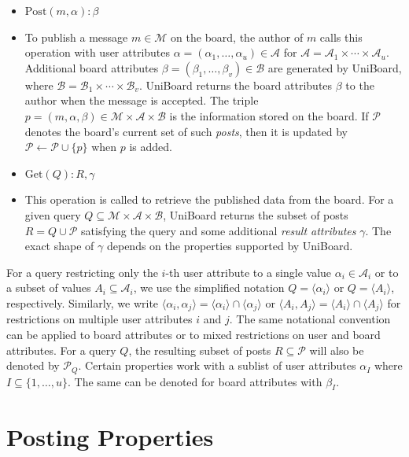 \documentclass[bibtotoc,halfparskip,oneside]{scrreprt}
\begin{document}
\begin{itemize}
	\item $\mathrm{Post}(m,\alpha):\beta$
	\item[]  To publish a message $m \in \mathcal{M}$ on the board, the author of $m$ calls this operation with user attributes $\alpha=(\alpha_1,\dots,\alpha_u)\in\mathcal{A}$ for $\mathcal{A}=\mathcal{A}_1\times\cdots\times\mathcal{A}_u$. Additional board attributes $\beta=(\beta_1,\dots,\beta_v)\in\mathcal{B}$ are generated by UniBoard, where $\mathcal{B}=\mathcal{B}_1\times\cdots\times\mathcal{B}_v$. UniBoard returns the board attributes $\beta$ to the author when the message is accepted. The triple $p=(m,\alpha,\beta)\in\mathcal{M}\times\mathcal{A}\times\mathcal{B}$ is the information stored on the board. If $\mathcal{P}$ denotes the board's current set of such \emph{posts}, then it is updated by $\mathcal{P}\leftarrow \mathcal{P}\cup\{p\}$ when $p$ is added. 
	\item $\mathrm{Get}(Q):R, \gamma$ 
	\item[] This operation is called to retrieve the published data from the board. For a given query $Q\subseteq\mathcal{M}\times\mathcal{A}\times\mathcal{B}$, UniBoard returns the subset of posts $R=Q\cup\mathcal{P}$ satisfying the query and some additional \emph{result attributes} $\gamma$. The exact shape of $\gamma$ depends on the properties supported by UniBoard.
	
\end{itemize}
For a query restricting only the $i$-th user attribute to a single value $\alpha_i\in \mathcal{A}_i$ or to a subset of values $A_i\subseteq \mathcal{A}_i$, we use the simplified notation $Q=\langle\alpha_i\rangle$ or $Q=\langle A_i\rangle$, respectively. Similarly, we write $\langle\alpha_i,\alpha_j\rangle=\langle\alpha_i\rangle\cap\langle\alpha_j\rangle$ or $\langle A_i,A_j\rangle=\langle A_i\rangle\cap\langle A_j\rangle$ for restrictions on multiple user attributes $i$ and $j$. The same notational convention can be applied to board attributes or to mixed restrictions on user and board attributes. For a query $Q$, the resulting subset of posts $R\subseteq \mathcal{P}$ will also be denoted by $\mathcal{P}_Q$.\newline
Certain properties work with a sublist of user attributes $\alpha_I$ where $I\subseteq\{1,\dots, u\}$. The same can be denoted for board attributes with $\beta_I$.
\section{Posting Properties}\label{ub2}
\end{document}
